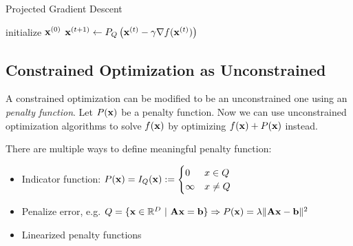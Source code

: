 \begin{algorithm}[H]
\caption{Projected Gradient Descent}
\begin{algorithmic}[1]
\State initialize \(\boldsymbol{\mathrm{x}}^{(0)}\)
	\State \(\boldsymbol{\mathrm{x}}^{(t+1)} \gets P_Q\left(\boldsymbol{\mathrm{x}}^{(t)} - \gamma \nabla f(\boldsymbol{\mathrm{x}}^{(t)})\right)\)
\EndFor
\EndProcedure
\end{algorithmic}
\end{algorithm}

\subsection{Constrained Optimization as Unconstrained}
A constrained optimization can be modified to be an unconstrained one using an \emph{penalty function}. Let \(P(\boldsymbol{\mathrm{x}})\) be a penalty function. Now we can use unconstrained optimization algorithms to solve \(f(\boldsymbol{\mathrm{x}})\) by optimizing \(f(\boldsymbol{\mathrm{x}}) + P(\boldsymbol{\mathrm{x}})\) instead.

There are multiple ways to define meaningful penalty function:
\begin{itemize}
\item Indicator function: \( P(\boldsymbol{\mathrm{x}}) = I_Q(\boldsymbol{\mathrm{x}}) := \begin{cases} 0 & x \in Q\\ \infty & x \neq Q \end{cases}\)
\item Penalize error, e.g. \(Q = \{\boldsymbol{\mathrm{x}} \in \mathbb{R}^D \ |\ \boldsymbol{\mathrm{Ax}} = \boldsymbol{\mathrm{b}}\} \Rightarrow P(\boldsymbol{\mathrm{x}}) = \lambda \|\boldsymbol{\mathrm{Ax}} - \boldsymbol{\mathrm{b}}\|^2\)
\item Linearized penalty functions
\end{itemize}